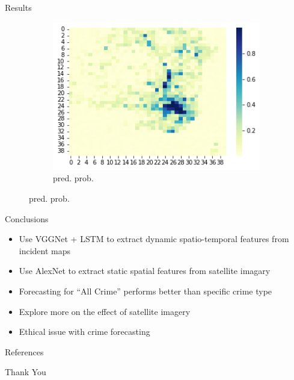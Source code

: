 \documentclass[10pt]{beamer}
\begin{document}
\begin{frame}{Results}
\begin{figure}[!htb]
{\begin{subfigure}{0.32\textwidth}
        \includegraphics[width=1\linewidth, height=0.3\textheight]{pred_robbery_prob.png}
        \caption{pred. prob.}
    \end{subfigure}
    }
\end{figure}
\end{frame}






\begin{frame}{Conclusions}
\begin{itemize}
    \item Use VGGNet + LSTM to extract dynamic spatio-temporal features from incident maps
    \item Use AlexNet to extract static spatial features from satellite imagary
    \item Forecasting for ``All Crime'' performs better than specific crime type
    \item Explore more on the effect of satellite imagery
    \item Ethical issue with crime forecasting \citep{gstrein2019ethical}
\end{itemize}
\end{frame}












\begin{frame}[allowframebreaks]{References}


\end{frame}

\begin{frame}
\Huge{\centerline{Thank You}}
\end{frame}

\end{document}

